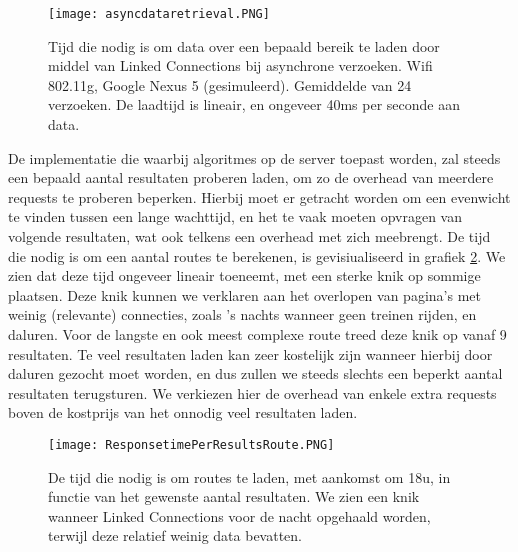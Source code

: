 \begin{figure}
	\centering
	\texttt{[image: asyncdataretrieval.PNG]}
	\caption[Laadtijd asynchroon laden Linked Connections]{Tijd die nodig is om data over een bepaald bereik te laden door middel van Linked Connections bij asynchrone verzoeken. Wifi 802.11g, Google Nexus 5 (gesimuleerd). Gemiddelde van 24 verzoeken. De laadtijd is lineair, en ongeveer 40ms per seconde aan data.}
	\label{fig:asyncdataretrieval}
\end{figure}

De implementatie die waarbij algoritmes op de server toepast worden, zal steeds een bepaald aantal resultaten proberen laden, om zo de overhead van meerdere requests te proberen beperken. Hierbij moet er getracht worden om een evenwicht te vinden tussen een lange wachttijd, en het te vaak moeten opvragen van volgende resultaten, wat ook telkens een overhead met zich meebrengt. De tijd die nodig is om een aantal routes te berekenen, is gevisiualiseerd in grafiek \ref{fig:responsetimeperresultsroute}. We zien dat deze tijd ongeveer lineair toeneemt, met een sterke knik op sommige plaatsen. Deze knik kunnen we verklaren aan het overlopen van pagina's met weinig (relevante) connecties, zoals 's nachts wanneer geen treinen rijden, en daluren. Voor de langste en ook meest complexe route treed deze knik op vanaf 9 resultaten. Te veel resultaten laden kan zeer kostelijk zijn wanneer hierbij door daluren gezocht moet worden, en dus zullen we steeds slechts een beperkt aantal resultaten terugsturen. We verkiezen hier de overhead van enkele extra requests boven de kostprijs van het onnodig veel resultaten laden.

\begin{figure}
	\centering
	\texttt{[image: ResponsetimePerResultsRoute.PNG]}
	\caption[Laadtijd routes in functie van aantal resultaten]{De tijd die nodig is om routes te laden, met aankomst om 18u, in functie van het gewenste aantal resultaten. We zien een knik wanneer Linked Connections voor de nacht opgehaald worden, terwijl deze relatief weinig data bevatten.}
	\label{fig:responsetimeperresultsroute}
\end{figure}

